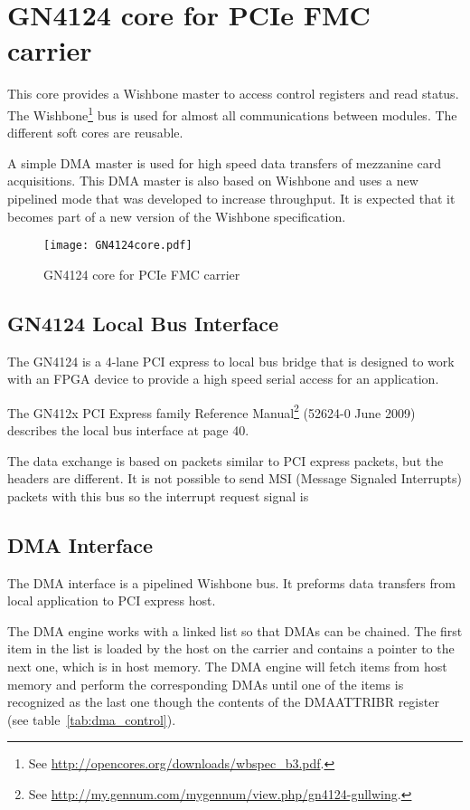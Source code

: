 \documentclass[10pt,a4paper]{cerndoc}
\begin{document}
  \section{GN4124 core for PCIe FMC carrier}
  This core provides a Wishbone master to access control registers and read status.  The Wishbone\footnote{See \href{http://opencores.org/downloads/wbspec\_b3.pdf}{http://opencores.org/downloads/wbspec\_b3.pdf}.} bus is used for almost all communications between modules. The different soft cores are reusable.
  
  A simple DMA master is used for high speed data transfers of mezzanine card acquisitions. This DMA master is also based on Wishbone and uses a new pipelined mode that was developed to increase  throughput. It is expected that it becomes part of a new version of the Wishbone specification.
  
\begin{figure}[!ht]
	\centering
		\texttt{[image: GN4124core.pdf]}
	\caption{GN4124 core for PCIe FMC carrier}
	\label{fig:GCWWM}
\end{figure} 
    \subsection{GN4124 Local Bus Interface}
    
The GN4124 is a 4-lane PCI express to local bus bridge that is designed to work with an FPGA device to provide a high speed serial access for an application.
    
The GN412x PCI Express family Reference Manual\footnote{See \href{http://my.gennum.com/mygennum/view.php/gn4124-gullwing}{http://my.gennum.com/mygennum/view.php/gn4124-gullwing}.} (52624-0 June 2009) describes the local bus interface at page 40.

The data exchange is based on packets similar to PCI express packets, but the headers are different. It is not possible to send MSI (Message Signaled Interrupts) packets with this bus so the interrupt request signal is 
    
    \subsection{DMA Interface}
The DMA interface is a pipelined Wishbone bus. It preforms data transfers from local application to PCI express host.

The DMA engine works with a linked list so that DMAs can be chained. The first item in the list is loaded by the host on the carrier and contains a pointer to the next one, which is in host memory. The DMA engine will fetch items from host memory and perform the corresponding DMAs until one of the items is recognized as the last one though the contents of the DMAATTRIBR register (see table~\ref{tab:dma_control}). 
\end{document}
